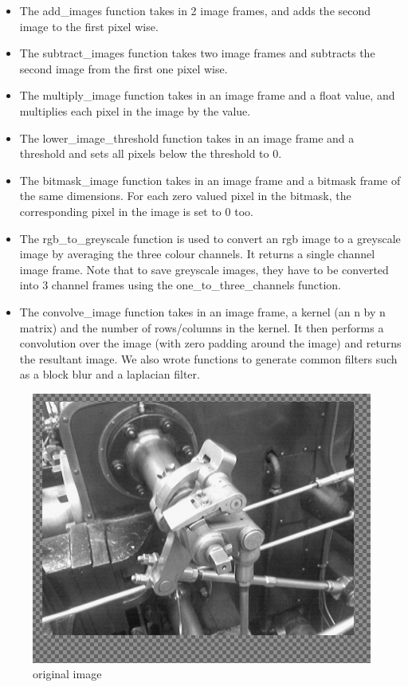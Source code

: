 \documentclass[11pt]{article}
\begin{document}
  \begin{itemize}
\item The add\_images function takes in 2 image frames, and adds the second image to the first pixel wise.

\item The subtract\_images function takes two image frames and subtracts the second image from the first one pixel wise.

\item The multiply\_image function takes in an image frame and a float value, and multiplies each pixel in the image by the value.

\item The lower\_image\_threshold function takes in an image frame and a threshold and sets all pixels below the threshold to 0.

\item The bitmask\_image function takes in an image frame and a bitmask frame of the same dimensions. For each zero valued pixel in the bitmask, the corresponding pixel in the image is set to 0 too.

\item The rgb\_to\_greyscale function is used to convert an rgb image to a greyscale image by averaging the three colour channels. It returns a single channel image frame. Note that to save greyscale images, they have to be converted into 3 channel frames using the  one\_to\_three\_channels function.

\item The convolve\_image function takes in an image frame, a kernel (an n by n matrix) and the number of rows/columns in the kernel. It then performs a convolution over the image (with zero padding around the image) and returns the resultant image. We also wrote functions to generate common filters such as a block blur and a laplacian filter.

\end{itemize}

\begin{figure}[h]
\caption{original image}
\includegraphics[scale=0.3]{original}
\left
\end{figure}
\end{document}
